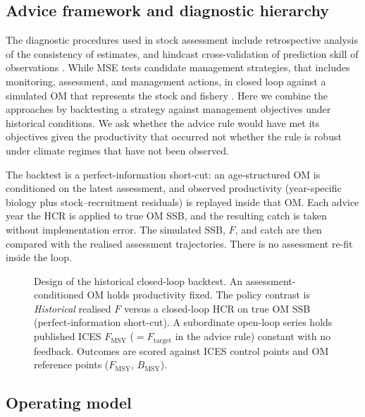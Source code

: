 \documentclass[11pt,a4paper]{article}
\newcommand{\Fmsy}{F_{\mathrm{MSY}}}
\newcommand{\Bmsy}{B_{\mathrm{MSY}}}
\newcommand{\Ftar}{F_{\mathrm{target}}}
\begin{document}
\subsection{Advice framework and diagnostic hierarchy}
\label{sec:diag-hierarchy}

The diagnostic procedures used in stock assessment include retrospective analysis of the consistency of estimates, and hindcast cross-validation of prediction skill of observations \citep{Carvalho2021cookbook}. While MSE tests candidate management strategies, that includes monitoring, assessment, and  management actions, in closed loop against a
simulated OM that represents the stock and fishery \citep{punt2016msebestpractice}. Here we combine the approaches  by backtesting a strategy against management
objectives under historical conditions. We ask whether the advice rule would have met its objectives given the productivity that occurred not whether the rule is robust under climate regimes that have not been observed.

The backtest is a perfect-information short-cut: an age-structured OM is
conditioned on the latest assessment, and observed productivity
(year-specific biology plus stock--recruitment residuals) is replayed
inside that OM. Each advice year the HCR is applied to true OM SSB, and
the resulting catch is taken without implementation error. The simulated
SSB, $F$, and catch are then compared with the realised assessment
trajectories. There is no assessment re-fit inside the loop.

\begin{figure}[htbp]
\centering

\caption{Design of the historical closed-loop backtest. An
assessment-conditioned OM holds productivity fixed. The policy contrast is
\emph{Historical} realised $F$ versus a closed-loop HCR on true OM SSB
(perfect-information short-cut). A subordinate open-loop series holds
published ICES $F_{\mathrm{MSY}}$ ($=\Ftar$ in the advice rule) constant
with no feedback. Outcomes are scored against ICES control points and OM
reference points ($\Fmsy$, $\Bmsy$).}
\label{fig:design}
\end{figure}

\subsection{Operating model}
\end{document}

